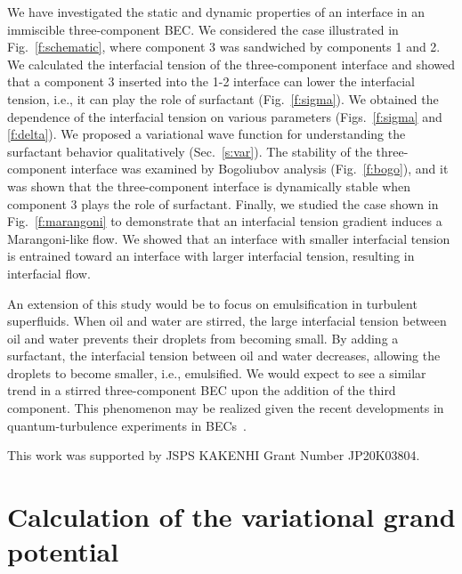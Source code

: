\documentclass[pra,aps,superscriptaddress,twocolumn,color]{revtex4-1}
\begin{document}
We have investigated the static and dynamic properties of an interface in an
immiscible three-component BEC.
We considered the case illustrated in Fig.~\ref{f:schematic}, where
component 3 was sandwiched by components 1 and 2.
We calculated the interfacial tension of the three-component interface and
showed that a component 3 inserted into the 1-2 interface can lower the
interfacial tension, i.e., it can play the role of surfactant
(Fig.~\ref{f:sigma}).
We obtained the dependence of the interfacial tension on various
parameters (Figs.~\ref{f:sigma} and \ref{f:delta}).
We proposed a variational wave function for understanding the surfactant
behavior qualitatively (Sec.~\ref{s:var}).
The stability of the three-component interface was examined by Bogoliubov
analysis (Fig.~\ref{f:bogo}), and it was shown that the three-component
interface is dynamically stable when component 3 plays the role of
surfactant.
Finally, we studied the case shown in Fig.~\ref{f:marangoni} to demonstrate
that an interfacial tension gradient induces a Marangoni-like flow.
We showed that an interface with smaller interfacial tension is entrained
toward an interface with larger interfacial tension, resulting in 
interfacial flow.

An extension of this study would be to focus on emulsification in turbulent
superfluids.
When oil and water are stirred, the large interfacial tension between oil
and water prevents their droplets from becoming small.
By adding a surfactant, the interfacial tension between oil and water
decreases, allowing the droplets to become smaller, i.e., emulsified.
We would expect to see a similar trend in a stirred three-component BEC upon
the addition of the third component.
This phenomenon may be realized given the recent developments in
quantum-turbulence experiments in BECs~\cite{Navon1,Navon2}.


\begin{acknowledgments}
This work was supported by JSPS KAKENHI Grant Number JP20K03804.
\end{acknowledgments}

\appendix

\section{Calculation of the variational grand potential}
\label{app}
\end{document}
